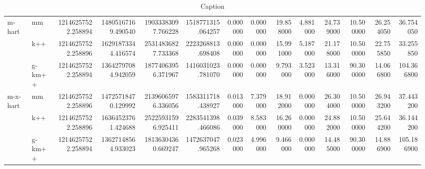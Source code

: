 \begin{table}[!ht]
{\begin{tabular}{llrrrrrrrrrrrr}
\cline{1-14}
\multirow[t]{3}{*}{m-hart} & mm & 12146257522.258894 & 14805167169.490540 & 19033383097.766228 & 1518771315.064257 & 0.000000 & 0.000000 & 19.858000 & 4.881000 & 24.739000 & 10.500000 & 26.254050 & 36.754050 \\
 & k++ & 12146257522.258896 & 16291873344.416574 & 25314836827.733368 & 2223268813.698408 & 0.000000 & 0.000000 & 15.991000 & 5.187000 & 21.178000 & 10.500000 & 22.755850 & 33.255850 \\
 & g-km++ & 12146257522.258894 & 13642797084.942059 & 18774063956.371967 & 1416031023.781070 & 0.000000 & 0.000000 & 9.793000 & 3.523000 & 13.316000 & 90.300000 & 14.066800 & 104.366800 \\
\cline{1-14}
\multirow[t]{3}{*}{m-x-hart} & mm & 12146257522.258896 & 14725718470.129992 & 21396065976.336056 & 1583311718.438927 & 0.013000 & 7.379000 & 18.912000 & 0.000000 & 26.304000 & 10.500000 & 26.943200 & 37.443200 \\
 & k++ & 12146257522.258896 & 16364523761.424688 & 25225931596.925411 & 2283541398.466086 & 0.039000 & 8.583000 & 16.260000 & 0.000000 & 24.882000 & 10.500000 & 25.644200 & 36.144200 \\
 & g-km++ & 12146257522.258894 & 13627148564.933023 & 18136304360.669247 & 1472637047.965268 & 0.023000 & 4.996000 & 9.466000 & 0.000000 & 14.485000 & 90.300000 & 14.886900 & 105.186900 \\
\cline{1-14}
\hline
\end{tabular}
}

\caption{Caption}
\label{tab:my_label}
\end{table}